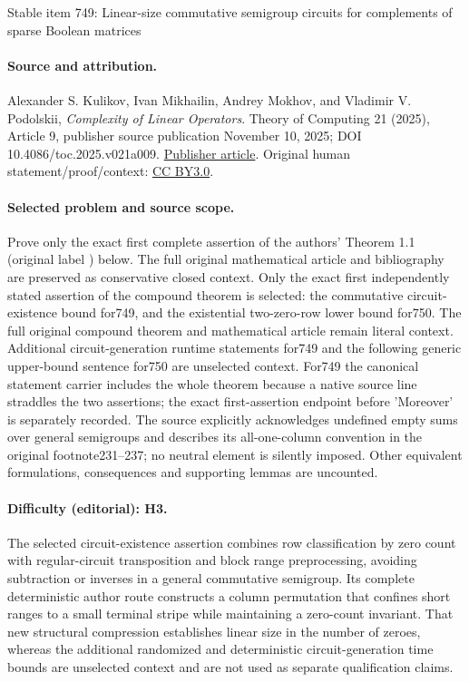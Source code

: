 \documentclass[11pt]{article}
\numberwithin{equation}{section}
\theoremstyle{definition}
\theoremstyle{plain}
\theoremstyle{plain}\newtheorem{observation}[theorem]{Observation}
\begin{document}
\begin{center}{\Large Stable item 749: Linear-size commutative semigroup circuits for complements of sparse Boolean matrices}\end{center}
\paragraph{Source and attribution.}
Alexander S. Kulikov, Ivan Mikhailin, Andrey Mokhov, and Vladimir V. Podolskii, \emph{Complexity of Linear Operators}. Theory of Computing 21 (2025), Article 9, publisher source publication November 10, 2025; DOI 10.4086/toc.2025.v021a009. \href{https://theoryofcomputing.org/articles/v021a009/}{Publisher article}. Original human statement/proof/context: \href{https://creativecommons.org/licenses/by/3.0/}{CC BY3.0}.
\paragraph{Selected problem and source scope.}
Prove only the exact first complete assertion of the authors' Theorem 1.1 (original label ) below. The full original mathematical article and bibliography are preserved as conservative closed context. Only the exact first independently stated assertion of the compound theorem is selected: the commutative circuit-existence bound for749, and the existential two-zero-row lower bound for750. The full original compound theorem and mathematical article remain literal context. Additional circuit-generation runtime statements for749 and the following generic upper-bound sentence for750 are unselected context. For749 the canonical statement carrier includes the whole theorem because a native source line straddles the two assertions; the exact first-assertion endpoint before 'Moreover' is separately recorded. The source explicitly acknowledges undefined empty sums over general semigroups and describes its all-one-column convention in the original footnote231--237; no neutral element is silently imposed.  Other equivalent formulations, consequences and supporting lemmas are uncounted.
\paragraph{Difficulty (editorial): H3.}
The selected circuit-existence assertion combines row classification by zero count with regular-circuit transposition and block range preprocessing, avoiding subtraction or inverses in a general commutative semigroup. Its complete deterministic author route constructs a column permutation that confines short ranges to a small terminal stripe while maintaining a zero-count invariant. That new structural compression establishes linear size in the number of zeroes, whereas the additional randomized and deterministic circuit-generation time bounds are unselected context and are not used as separate qualification claims.
\end{document}
